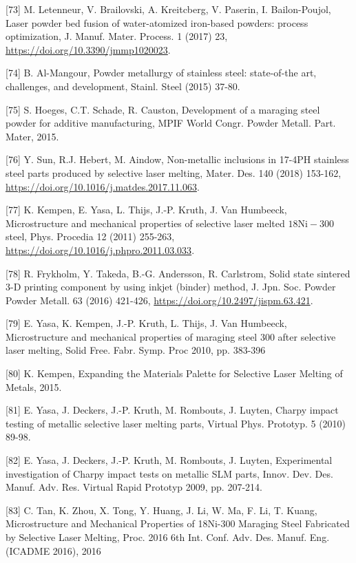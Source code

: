 \documentclass[10pt]{article}
\begin{document}
[73] M. Letenneur, V. Brailovski, A. Kreitcberg, V. Paserin, I. Bailon-Poujol, Laser powder bed fusion of water-atomized iron-based powders: process optimization, J. Manuf. Mater. Process. 1 (2017) 23, \href{https://doi.org/10.3390/jmmp1020023}{https://doi.org/10.3390/jmmp1020023}.

[74] B. Al-Mangour, Powder metallurgy of stainless steel: state-of-the art, challenges, and development, Stainl. Steel (2015) 37-80.

[75] S. Hoeges, C.T. Schade, R. Causton, Development of a maraging steel powder for additive manufacturing, MPIF World Congr. Powder Metall. Part. Mater, 2015.

[76] Y. Sun, R.J. Hebert, M. Aindow, Non-metallic inclusions in 17-4PH stainless steel parts produced by selective laser melting, Mater. Des. 140 (2018) 153-162, \href{https://doi.org/10.1016/j.matdes.2017.11.063}{https://doi.org/10.1016/j.matdes.2017.11.063}.

[77] K. Kempen, E. Yasa, L. Thijs, J.-P. Kruth, J. Van Humbeeck, Microstructure and mechanical properties of selective laser melted $18 \mathrm{Ni}-300$ steel, Phys. Procedia 12 (2011) 255-263, \href{https://doi.org/10.1016/j.phpro.2011.03.033}{https://doi.org/10.1016/j.phpro.2011.03.033}.

[78] R. Frykholm, Y. Takeda, B.-G. Andersson, R. Carlstrom, Solid state sintered 3-D printing component by using inkjet (binder) method, J. Jpn. Soc. Powder Powder Metall. 63 (2016) 421-426, \href{https://doi.org/10.2497/jispm.63.421}{https://doi.org/10.2497/jispm.63.421}.

[79] E. Yasa, K. Kempen, J.-P. Kruth, L. Thijs, J. Van Humbeeck, Microstructure and mechanical properties of maraging steel 300 after selective laser melting, Solid Free. Fabr. Symp. Proc 2010, pp. 383-396

[80] K. Kempen, Expanding the Materials Palette for Selective Laser Melting of Metals, 2015.

[81] E. Yasa, J. Deckers, J.-P. Kruth, M. Rombouts, J. Luyten, Charpy impact testing of metallic selective laser melting parts, Virtual Phys. Prototyp. 5 (2010) 89-98.

[82] E. Yasa, J. Deckers, J.-P. Kruth, M. Rombouts, J. Luyten, Experimental investigation of Charpy impact tests on metallic SLM parts, Innov. Dev. Des. Manuf. Adv. Res. Virtual Rapid Prototyp 2009, pp. 207-214.

[83] C. Tan, K. Zhou, X. Tong, Y. Huang, J. Li, W. Ma, F. Li, T. Kuang, Microstructure and Mechanical Properties of 18Ni-300 Maraging Steel Fabricated by Selective Laser Melting, Proc. 2016 6th Int. Conf. Adv. Des. Manuf. Eng. (ICADME 2016), 2016
\end{document}
